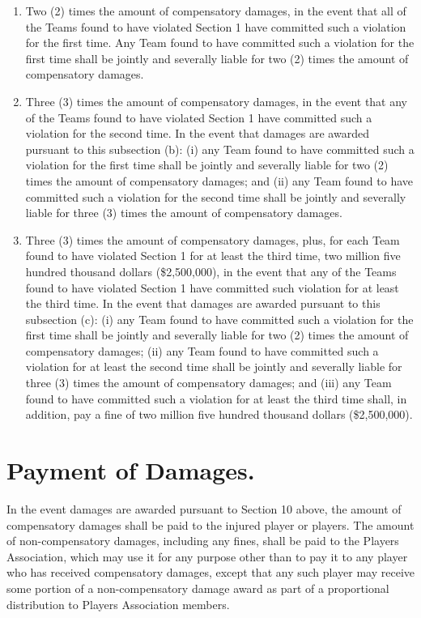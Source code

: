\documentclass[
]{book}
\providecommand{\tightlist}{%
  \setlength{\itemsep}{0pt}\setlength{\parskip}{0pt}}
\begin{document}
\begin{enumerate}
\def\labelenumi{(\alph{enumi})}
\tightlist
\item
  Two (2) times the amount of compensatory damages, in the event that all of the Teams found to have violated Section 1 have committed such a violation for the first time. Any Team found to have committed such a violation for the first time shall be jointly and severally liable for two (2) times the amount of compensatory damages.
\item
  Three (3) times the amount of compensatory damages, in the event that any of the Teams found to have violated Section 1 have committed such a violation for the second time. In the event that damages are awarded pursuant to this subsection (b): (i) any Team found to have committed such a violation for the first time shall be jointly and severally liable for two (2) times the amount of compensatory damages; and (ii) any Team found to have committed such a violation for the second time shall be jointly and severally liable for three (3) times the amount of compensatory damages.
\item
  Three (3) times the amount of compensatory damages, plus, for each Team found to have violated Section 1 for at least the third time, two million five hundred thousand dollars (\$2,500,000), in the event that any of the Teams found to have violated Section 1 have committed such violation for at least the third time. In the event that damages are awarded pursuant to this subsection (c): (i) any Team found to have committed such a violation for the first time shall be jointly and severally liable for two (2) times the amount of compensatory damages; (ii) any Team found to have committed such a violation for at least the second time shall be jointly and severally liable for three (3) times the amount of compensatory damages; and (iii) any Team found to have committed such a violation for at least the third time shall, in addition, pay a fine of two million five hundred thousand dollars (\$2,500,000).
\end{enumerate}

\hypertarget{payment-of-damages.}{%
\section{Payment of Damages.}\label{payment-of-damages.}}

In the event damages are awarded pursuant to Section 10 above, the amount of compensatory damages shall be paid to the injured player or players. The amount of non-compensatory damages, including any fines, shall be paid to the Players Association, which may use it for any purpose other than to pay it to any player who has received compensatory damages, except that any such player may receive some portion of a non-compensatory damage award as part of a proportional distribution to Players Association members.
\end{document}
